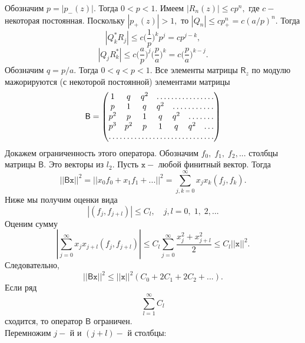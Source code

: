 \documentclass[12 pt, a4 paper]{article}
\theoremstyle{plain}   \newtheorem{Pro}{Задача}
\begin{document}
Обозначим
$ p=|p_- (z) | . $
Тогда
$ 0<p<1 . $
Имеем
$ |R_n (z) | \leq cp^n , $
где
$ c - $
некоторая постоянная. Поскольку
$ |p_+ (z)| >1 , $
то
$ |Q_n | \leq cp_+ ^n =c( a/p )^n . $
Тогда
$$
  |Q_k ^{\ast} R_j | \leq c \biggl (\frac{1}{p} \biggr )^k p^j =cp^{j-k},
$$
$$
  |Q_j R_k ^{\ast} | \leq c\biggl (\frac{a}{p} \biggr )^j
   \biggl (\frac{p}{a}\biggr )^k =
  c\biggl (\frac{p}{a}\biggr )^{k-j}.
$$
Обозначим
$ q=p/a . $
Тогда
$ 0<q<p<1. $
Все элементы матрицы
$ \mathsf{R}_z $
по модулю мажорируются (с некоторой постоянной) элементами матрицы
\begin{equation*}
  \mathsf{B}=
    \begin{pmatrix}
	  1 & q & q^2 & \hdotsfor{4}\\
	  p & 1 & q & q^2 & \hdotsfor{3}\\
	  p^2 & p & 1 & q & q^2 & \hdotsfor{2}\\
	  p^3 & p^2 & p & 1 & q & q^2 & \dots \\
	  \hdotsfor{7}
	\end{pmatrix}
\end{equation*}
Докажем ограниченность этого оператора. Обозначим
$ f_0 , \; f_1 , \; f_2 ,... $
столбцы матрицы
$ \mathsf{B}. $
Это векторы из
$ l_2 . $
Пусть
$ \mathtt{x} - $
любой финитный вектор. Тогда
$$
  || \mathsf{B} \mathtt{x} ||^2 =
  || x_0 f_0 +x_1 f_1 +... ||^2 =
  \sum _{j,k=0}^{\infty}
  x_j x_k (f_j , f_k ) .
$$
Ниже мы получим оценки вида
$$
  |(f_j , f_{j+l})| \leq C_l ,
  \quad j,l=0, \; 1, \; 2,...
$$
Оценим сумму
$$
  | \sum _{j=0}^{\infty} x_j x_{j+l} (f_j , f_{j+l})|
  \leq C_l \sum _{j=0}^{\infty}
  \frac{x_j ^2 + x_{j+l}^2}{2}
  \leq C_l || \mathtt{x} ||^2 .
$$
Следовательно,
$$
  || \mathsf{B} \mathtt{x} ||^2 \leq
  || \mathtt{x} ||^2 ( C_0 +2C_1 +2C_2 +...).
$$
Если ряд
$$
  \sum _{l=1}^{\infty} C_l
$$
сходится, то оператор
$ \mathsf{B} $
ограничен.\\
Перемножим $ j- $ й и $ (j+l)- $ й столбцы:
\end{document}
